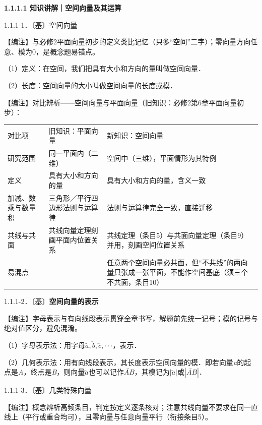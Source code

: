 \textbf{1.1.1.1 知识讲解｜空间向量及其运算}

1.1.1-1．〔基〕空间向量

【⁠编⁠注⁠】与必修2平面向量初步的定义类比记忆（只多``空间''二字）；零向量方向任意、模为0，是概念题易错点。

（1）定义：在空间，我们把具有大小和方向的量叫做空间向量．

（2）长度：空间向量的大小叫做空间向量的长度或模．

【⁠编⁠注⁠】对比辨析------空间向量与平面向量（旧知识：必修2第6章平面向量初步）：

{\def\LTcaptype{none} %
\begin{longtable}[]{@{}
  >{\raggedright\arraybackslash}p{}
  >{\raggedright\arraybackslash}p{}
  >{\raggedright\arraybackslash}p{}@{}}
\toprule\noalign{}
\endhead
\bottomrule\noalign{}
\endlastfoot
对比项 & 旧知识：平面向量 & 新知识：空间向量 \\
研究范围 & 同一平面内（二维） & 空间中（三维），平面情形为其特例 \\
定义 & 具有大小和方向的量 & 具有大小和方向的量，含义一致 \\
加减、数乘与数量积 & 三角形／平行四边形法则与运算律 &
法则与运算律完全一致，直接迁移 \\
共线与共面 & 共线向量定理刻画平面内位置关系 &
共线定理（条目5）与共面向量定理（条目9）并用，刻画空间位置关系 \\
易混点 & ------ &
任意两个空间向量必共面，但``不共线''的两向量只张成一张平面，不能作空间基底（须三个不共面，条目10） \\
\end{longtable}
}

1.1.1-2．〔基〕\textbf{空间向量的表示}

【⁠编⁠注⁠】字母表示与有向线段表示贯穿全章书写，解题前先统一记号；模的记号与绝对值区分，避免混淆。

（1）字母表示法：用字母\(\overset{⃑}{a},\overset{⃑}{b},\overset{⃑}{c}, \cdot \cdot \cdot\)，表示．

（2）几何表示法：用有向线段表示，其长度表示空间向量的模．即若向量\emph{a}的起点是\emph{A}，终点是\emph{B}，则向量\(\overset{⃑}{a}\)也可以记作\(\overset{⃑}{AB}\)，其模记为\(\left| \overset{⃑}{a} \right|\)或\(\left| \overset{⃑}{AB} \right|\)．

1.1.1-3．〔基〕几类特殊向量

【⁠编⁠注⁠】概念辨析高频条目，判定按定义逐条核对；注意共线向量不要求在同一直线上（平行或重合均可），且零向量与任意向量平行（衔接条目5）。

